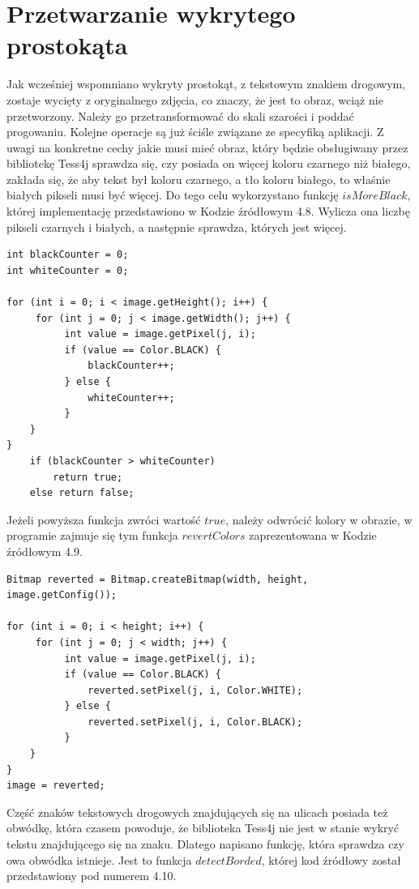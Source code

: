 \documentclass[eng,oneside]{mgr}
\begin{document}
\section{Przetwarzanie wykrytego prostokąta}
Jak wcześniej wspomniano wykryty prostokąt, z tekstowym znakiem drogowym, zostaje wycięty z oryginalnego zdjęcia, co znaczy, że jest to obraz, wciąż nie przetworzony. Należy go przetransformować do skali szarości i poddać progowaniu. Kolejne operacje są już ściśle związane ze specyfiką aplikacji. Z uwagi na konkretne cechy jakie musi mieć obraz, który będzie obsługiwany przez bibliotekę Tess4j sprawdza się, czy posiada on więcej koloru czarnego niż białego, zakłada się, że aby tekst był koloru czarnego, a tło koloru białego, to właśnie białych pikseli musi być więcej. Do tego celu wykorzystano funkcję $isMoreBlack$, której implementację przedstawiono w Kodzie źródłowym 4.8. Wylicza ona liczbę pikseli czarnych i białych, a następnie sprawdza, których jest więcej.
\begin{lstlisting}[caption={Kod programu, odpowiadający za sprawdzenie czy jest więcej czarnych pikseli.}]
int blackCounter = 0;
int whiteCounter = 0;

for (int i = 0; i < image.getHeight(); i++) {
     for (int j = 0; j < image.getWidth(); j++) {
          int value = image.getPixel(j, i);
          if (value == Color.BLACK) {
              blackCounter++;
          } else {
              whiteCounter++;
          }
    }
}
    if (blackCounter > whiteCounter)
        return true;
    else return false;
\end{lstlisting}
\par Jeżeli powyższa funkcja zwróci wartość $true$, należy odwrócić kolory w obrazie, w programie zajmuje się tym funkcja $revertColors$ zaprezentowana w Kodzie źródłowym 4.9.
\begin{lstlisting}[caption={Kod programu, odpowiadający za odwrócenie kolorów w obrazie.}]
Bitmap reverted = Bitmap.createBitmap(width, height, image.getConfig());

for (int i = 0; i < height; i++) {
     for (int j = 0; j < width; j++) {
          int value = image.getPixel(j, i);
          if (value == Color.BLACK) {
              reverted.setPixel(j, i, Color.WHITE);
          } else {
              reverted.setPixel(j, i, Color.BLACK);
          }
    }
}
image = reverted;
\end{lstlisting}
\par Część znaków tekstowych drogowych znajdujących się na ulicach posiada też obwódkę, która czasem powoduje, że biblioteka Tess4j nie jest w stanie wykryć tekstu znajdującego się na znaku. Dlatego napisano funkcję, która sprawdza czy owa obwódka istnieje. Jest to funkcja $detectBorded$, której kod źródłowy został przedstawiony pod numerem 4.10.
\end{document}
